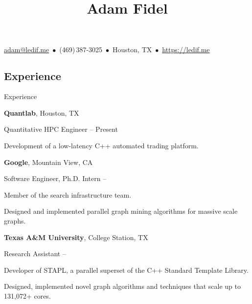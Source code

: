 \documentclass[a4paper,10pt,oneside]{article}
\begin{document}

\title{Adam Fidel}

\begin{subtitle}
\href{mailto:adam@ledif.me}
{adam@ledif.me}
\,$\bullet$\,
(469)\,387-3025
\,$\bullet$\,
Houston, TX
\,$\bullet$\,
\href{https://ledif.me}
{https://ledif.me}
\end{subtitle}

\begin{body}

\section{Experience}
{Experience}


\textbf{Quantlab},
Houston, TX
\par
Quantitative HPC Engineer
\hfill
{} --
Present
\begin{detail}
Development of a low-latency C++ automated trading platform.
\par
\end{detail}
\EntryGap


\textbf{Google},
Mountain View, CA
\par
Software Engineer, Ph.D. Intern
\hfill
{} --
\begin{detail}
Member of the search infrastructure team.
\par
 Designed and implemented parallel graph mining algorithms for massive scale graphs.
 \par
\end{detail}
\EntryGap



\textbf{Texas A\&M University}, College Station, TX
\par
Research Assistant
\hfill
{} --
\begin{detail}
Developer of STAPL, a parallel superset of the C++ Standard Template Library.
\par
Designed, implemented novel graph algorithms and techniques that scale up to 131,072+ cores.
\par
\end{detail}
\EntryGap


\end{body}
\end{document}
